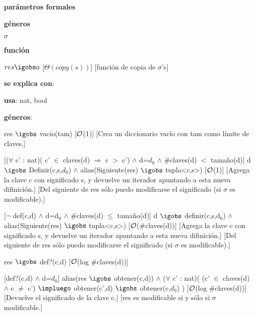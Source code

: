 \begin{Interfaz}
	
	\textbf{parámetros formales}\parindent\\
	\parbox{1.7cm}{\textbf{géneros}} $\sigma$\\
	\parbox[t]{1.7cm}{\textbf{función}}\parbox[t]{\textwidth-2\parindent-1.7cm}{%
	    	{$res \igobs a$}
		[$\Theta(copy(s))$]
		[función de copia de $\sigma$'s]
	}
	
	\textbf{se explica con}: 
	
	\textbf{usa}: nat, bool
	
	\textbf{géneros}: 
	
	
	{res $\igobs$ vacio(tam)}
	[$\mathcal{O}$(1)]
	[Crea un diccionario vacío con tam como límite de claves.]
	
	[($\forall$ c' : nat)( c' $\in$ claves(d) $\Rightarrow$ c $>$ c') $\land$ d=$d_0$ $\land$ $\#$claves(d) $<$ tamaño(d)]
	{d $\igobs$ Definir(c,s,$d_0$) $\land$ alias(Siguiente(res) $\igobs$ tupla<c,s>)}
	[$\mathcal{O}$(1)]
	[Agrega la clave c con significado s, y devuelve un iterador apuntando a esta nueva difinición.]
	[Del siguiente de res sólo puedo modificarse el significado (si $\sigma$ es modificable).]
	
	[$\neg$ def(c,d) $\land$ d=d$_0$ $\land$ $\#$claves(d) $\leq$ tamaño(d)]
	{d $\igobs$ definir(c,s,d$_0$) $\land$ alias(Siguiente(res) $\igobs$ tupla<c,s>)}
	[$\mathcal{O}$($\#$claves(d))]
	[Agrega la clave c con significado s, y devuelve un iterador apuntando a esta nueva difinición.]
	[Del siguiente de res sólo puedo modificarse el significado (si $\sigma$ es modificable).]
	
	{res $\igobs$ def?(c,d)}
	[$\mathcal{O}$(log $\#$claves(d))]
	
	[def?(c,d) $\land$ d=$d_0$]
	{alias(res $\igobs$ obtener(c,d)) $\land$ ($\forall$ c' : nat)( (c' $\in$ claves(d) $\land$ c $\neq$ c') 
	$\impluego$ obtener(c',d) $\igobs$ obtener(c,$d_0$) )}
	[$\mathcal{O}$(log $\#$claves(d))]
	[Devuelve el significado de la clave c.]
	[res es modificable si y sólo si $\sigma$ modificable.]
	
\end{Interfaz}

